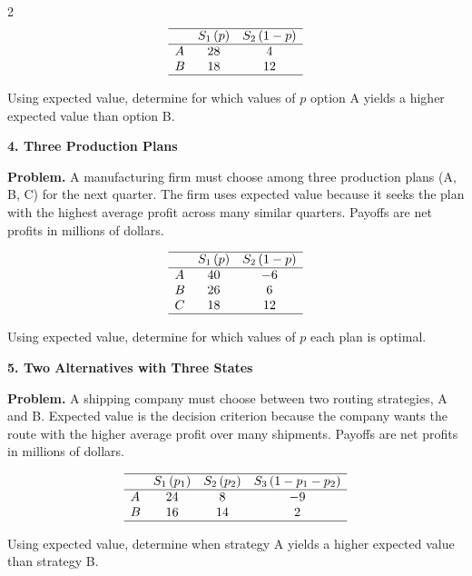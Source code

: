 \documentclass[12pt]{article}
\newcommand{\SubsectionBox}[1]{%
	\noindent\colorbox{gray!30}{%
		\parbox{\linewidth}{\textbf{#1}}%
	}\par\vspace{0.35cm}%
}
\begin{document}
\begin{multicols}{2}
		\[
		\begin{array}{lcc}
			\hline
			& S_1\,(p) & S_2\,(1-p) \\
			\hline
			A & 28 & 4 \\
			B & 18 & 12 \\
			\hline
		\end{array}
		\]
		
		Using expected value, determine for which values of \(p\) option A yields a higher expected value than option B.
		
		\vspace{0.25cm}
		\SubsectionBox{4. Three Production Plans}\vspace{-0.25cm}
		\textbf{Problem.}
		A manufacturing firm must choose among three production plans (A, B, C) for the next quarter. The firm uses expected value because it seeks the plan with the highest average profit across many similar quarters. Payoffs are net profits in millions of dollars.
		
		\[
		\begin{array}{lcc}
			\hline
			& S_1\,(p) & S_2\,(1-p) \\
			\hline
			A & 40 & -6 \\
			B & 26 & 6 \\
			C & 18 & 12 \\
			\hline
		\end{array}
		\]
		
		Using expected value, determine for which values of \(p\) each plan is optimal.
		
		\vspace{0.25cm}
		\SubsectionBox{5. Two Alternatives with Three States}\vspace{-0.25cm}
		\textbf{Problem.}
		A shipping company must choose between two routing strategies, A and B. Expected value is the decision criterion because the company wants the route with the higher average profit over many shipments. Payoffs are net profits in millions of dollars.
		
		\[
		\begin{array}{lccc}
			\hline
			& S_1\,(p_1) & S_2\,(p_2) & S_3\,(1-p_1-p_2) \\
			\hline
			A & 24 & 8 & -9 \\
			B & 16 & 14 & 2 \\
			\hline
		\end{array}
		\]
		
		Using expected value, determine when strategy A yields a higher expected value than strategy B.
		

\end{multicols}
\end{document}
